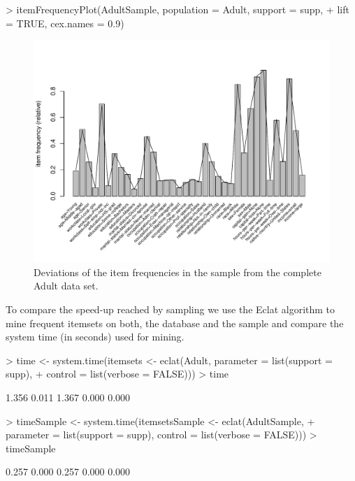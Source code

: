 \documentclass[10pt,a4paper]{article}
\begin{document}
\begin{Schunk}
\begin{Sinput}
> itemFrequencyPlot(AdultSample, population = Adult, support = supp, 
+     lift = TRUE, cex.names = 0.9)
\end{Sinput}
\end{Schunk}
\begin{figure}
\centering
\includegraphics{arules-035}
\caption{Deviations of the item frequencies in the sample from 
the complete Adult data set.}
\label{fig:itemFrequencyPlot3}
\end{figure}

To compare the speed-up reached by sampling we use the Eclat algorithm
to mine frequent itemsets on both, the database and the sample
and compare the system time (in seconds) used for mining.

\begin{Schunk}
\begin{Sinput}
> time <- system.time(itemsets <- eclat(Adult, parameter = list(support = supp), 
+     control = list(verbose = FALSE)))
> time
\end{Sinput}
\begin{Soutput}
[1] 1.356 0.011 1.367 0.000 0.000
\end{Soutput}
\begin{Sinput}
> timeSample <- system.time(itemsetsSample <- eclat(AdultSample, 
+     parameter = list(support = supp), control = list(verbose = FALSE)))
> timeSample
\end{Sinput}
\begin{Soutput}
[1] 0.257 0.000 0.257 0.000 0.000
\end{Soutput}
\end{Schunk}
\end{document}
